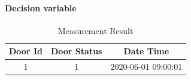 \paragraph*{Decision variable}


\begin{table}[htb]
\centering
\begin{tabular}{|c| c| c|} 
\hline
Door Id & Door Status & Date Time \\
\hline
1& 1 & 2020-06-01 09:00:01 \\ [1ex] 
\hline
\end{tabular}
\caption{Measurement Result}
\label{tab:measurement_result}
\end{table}

\begin{table}[htb]
\centering
{}
\caption{Door Open Possibility}
\label{tab:open_possibilities}
\end{table}

